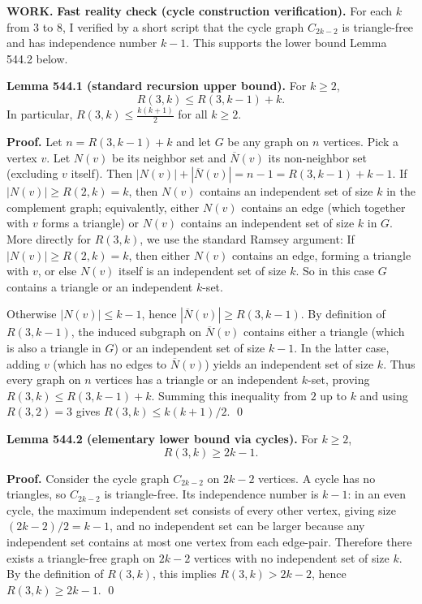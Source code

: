 \noindent\textbf{WORK.}
\textbf{Fast reality check (cycle construction verification).}
For each $k$ from $3$ to $8$, I verified by a short script that the cycle graph $C_{2k-2}$ is triangle-free and has independence number $k-1$.
This supports the lower bound Lemma 544.2 below.

\medskip
\textbf{Lemma 544.1 (standard recursion upper bound).}
For $k\ge 2$,
\[
R(3,k)\le R(3,k-1)+k.
\]
In particular, $R(3,k)\le \frac{k(k+1)}{2}$ for all $k\ge 2$.

\textbf{Proof.}
Let $n=R(3,k-1)+k$ and let $G$ be any graph on $n$ vertices.
Pick a vertex $v$.
Let $N(v)$ be its neighbor set and $\overline N(v)$ its non-neighbor set (excluding $v$ itself).
Then $|N(v)|+|\overline N(v)|=n-1=R(3,k-1)+k-1$.
If $|N(v)|\ge R(2,k)=k$, then $N(v)$ contains an independent set of size $k$ in the complement graph; equivalently, either $N(v)$ contains an edge (which together with $v$ forms a triangle) or $N(v)$ contains an independent set of size $k$ in $G$.
More directly for $R(3,k)$, we use the standard Ramsey argument:
If $|N(v)|\ge R(2,k)=k$, then either $N(v)$ contains an edge, forming a triangle with $v$, or else $N(v)$ itself is an independent set of size $k$.
So in this case $G$ contains a triangle or an independent $k$-set.

Otherwise $|N(v)|\le k-1$, hence $|\overline N(v)|\ge R(3,k-1)$.
By definition of $R(3,k-1)$, the induced subgraph on $\overline N(v)$ contains either a triangle (which is also a triangle in $G$) or an independent set of size $k-1$.
In the latter case, adding $v$ (which has no edges to $\overline N(v)$) yields an independent set of size $k$.
Thus every graph on $n$ vertices has a triangle or an independent $k$-set, proving $R(3,k)\le R(3,k-1)+k$.
Summing this inequality from $2$ up to $k$ and using $R(3,2)=3$ gives $R(3,k)\le k(k+1)/2$. \qed

\medskip
\textbf{Lemma 544.2 (elementary lower bound via cycles).}
For $k\ge 2$,
\[
R(3,k)\ge 2k-1.
\]

\textbf{Proof.}
Consider the cycle graph $C_{2k-2}$ on $2k-2$ vertices.
A cycle has no triangles, so $C_{2k-2}$ is triangle-free.
Its independence number is $k-1$: in an even cycle, the maximum independent set consists of every other vertex, giving size $(2k-2)/2=k-1$, and no independent set can be larger because any independent set contains at most one vertex from each edge-pair.
Therefore there exists a triangle-free graph on $2k-2$ vertices with no independent set of size $k$.
By the definition of $R(3,k)$, this implies $R(3,k)>2k-2$, hence $R(3,k)\ge 2k-1$. \qed

